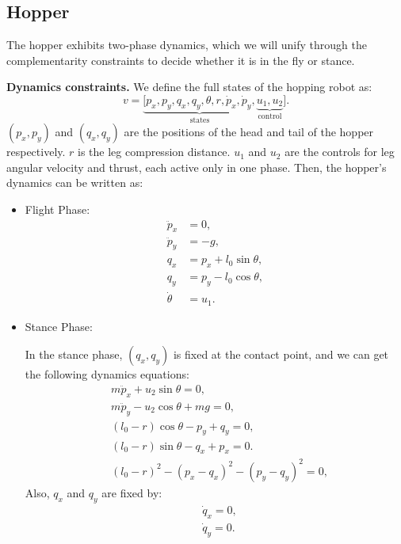 \subsection{Hopper}\label{app:formulation-hopper}
The hopper exhibits two-phase dynamics, which we will unify through the complementarity constraints to decide whether it is in the fly or stance.

\textbf{Dynamics constraints. }
We define the full states of the hopping robot as:
$$v = \underbrace{[p_x, p_y, q_x, q_y, \theta, r, \dot{p}_x,\dot{p}_y,}_{\text{states}} \underbrace{u_1,u_2}_{\text{control}}].$$ 
$(p_x, p_y)$ and $(q_x, q_y)$ are the positions of the head and tail of the hopper respectively. $r$ is the leg compression distance. $u_1$ and $u_2$ are the controls for leg angular velocity and thrust, each active only in one phase.
Then, the hopper's dynamics can be written as:
\begin{itemize}
    \item Flight Phase:
    \begin{subequations} \label{eq:2dhopper_flight}
        \begin{align}
        \ddot{p}_x &= 0,\label{eq:2dhopper_flight:01}\\
        \ddot{p}_y &=-g,\label{eq:2dhopper_flight:02}\\
        q_x & = p_x + l_0\sin\theta,\label{eq:2dhopper_flight:03}\\
        q_y &= p_y - l_0\cos\theta,\label{eq:2dhopper_flight:04}\\
        \dot{\theta} &=u_1. \label{eq:2dhopper_flight:05}
    \end{align}
    \end{subequations}
    \item Stance Phase:
    
    In the stance phase, $(q_x, q_y)$ is fixed at the contact point, and we can get the following dynamics equations:
    \begin{subequations}\label{eq:2dhopper_stance}
        \begin{align}
        &m\ddot{p}_x + u_2\sin\theta = 0, \label{eq:2dhopper_stance:01}\\
        &m\ddot{p}_y - u_2\cos\theta + mg = 0,\label{eq:2dhopper_stance:02}\\
        &(l_0-r)\cos\theta - p_y + q_y = 0,\label{eq:2dhopper_stance:03}\\
        &(l_0-r)\sin\theta - q_x + p_x = 0.\label{eq:2dhopper_stance:04}\\
         &(l_0-r)^2-(p_x -q_x)^2 - (p_y - q_y)^2 = 0,\label{eq:2dhopper_stance:05}
        \end{align}
    \end{subequations}
    Also, $q_x$ and $q_y$ are fixed by:
    \begin{subequations}\label{eq:2dhopper_stance_02}
        \begin{align}
        &\dot{q}_x = 0,\label{eq:2dhopper_stance_02:01}\\
        &\dot{q}_y = 0.\label{eq:2dhopper_stance_02:02}
    \end{align}
    \end{subequations}
\end{itemize}
